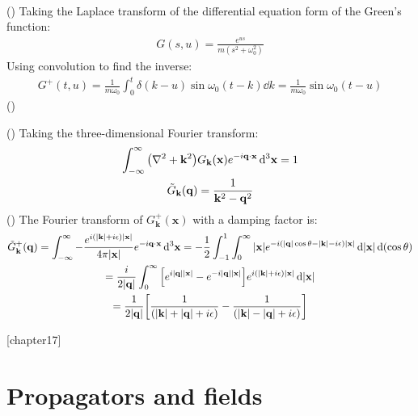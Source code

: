 \documentclass{report}
\theoremstyle{definition}
\begin{document}
\begin{chapter16}
\begin{gather*}
	\end{gather*}
	()
	Taking the Laplace transform of the differential equation form of the Green's function:
	\begin{gather*}
		G(s,u) = \frac{e^{us}}{m(s^2 + \omega_0^2)}
	\end{gather*}
	Using convolution to find the inverse:
	\begin{gather*}
		G^+(t,u) = \frac{1}{m\omega_0}\int_0^{t} \delta(k-u) \sin \omega_0(t - k) \dd{k}  = \frac{1}{m\omega_0}\sin\omega_0(t-u)
	\end{gather*}
	()
\end{chapter16}
	
\begin{chapter16}\label{prob:4}
	()
	Taking the three-dimensional Fourier transform:
	\begin{gather*}
		\int_{-\infty}^{\infty} \pqty{\nabla^2 + \mathbf k^2}G_{\mathbf k}(\mathbf x)e^{-i\bf q\cdot x}\,\dd^3{\bf x} = 1 \\
		\tilde G_{\mathbf k}(\mathbf q) = \frac{1}{\mathbf k^2 - \mathbf q^2}
	\end{gather*}
	()
	The Fourier transform of $G^+_{\mathbf k}(\mathbf x)$ with a damping factor is:
	\begin{gather*}
		\tilde G^+_{\mathbf k}(\mathbf q) = \int_{-\infty}^{\infty} -\frac{e^{i\pqty{\abs{\mathbf k} + i\epsilon}\abs{\mathbf x}}}{4\pi\abs{\mathbf x}}e^{-i\bf q\cdot x}\,\dd^3{\bf x} = -\frac{1}{2}\int_{-1}^{1}\int_0^{\infty}{\abs{\mathbf x}e^{-i\pqty{\abs{\mathbf q}\cos\theta -\abs{\mathbf k} - i\epsilon}\abs{\mathbf x}}} \dd{\abs{\mathbf x}}\dd\pqty{\cos\theta} \\
		= \frac{i}{2\abs{\mathbf q}}\int_{0}^{\infty} \bqty{e^{i\abs{\mathbf q}\abs{\mathbf x}}- e^{-i\abs{\mathbf q}\abs{\mathbf x}}}e^{i\pqty{\abs{\mathbf k} + i\epsilon}\abs{\mathbf x}} \dd{\abs{\mathbf x}} \\
		= \frac{1}{2\abs{\bf q}}\bqty{\frac{1}{\pqty{\abs{\bf k} + \abs{\bf q} + i\epsilon}}- \frac{1}{ \pqty{\abs{\bf k} - \abs{\bf q} + i\epsilon}}}
	\end{gather*}
\end{chapter16}

\newtheorem{chapter17}{Problem}
[chapter17]
\chapter{Propagators and fields}
\end{document}
